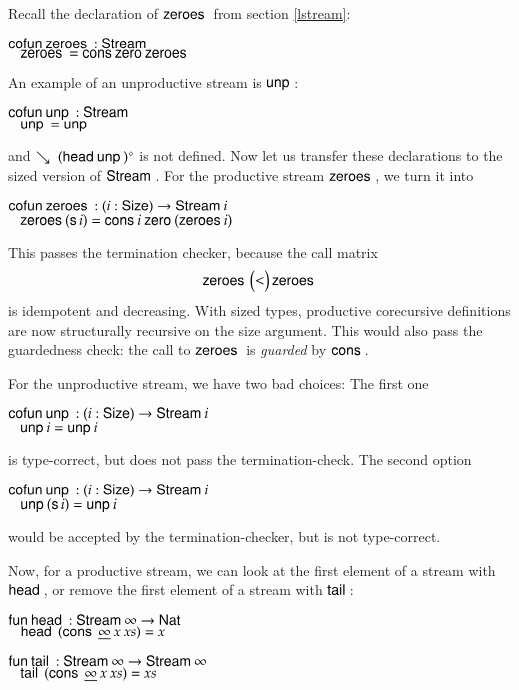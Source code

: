 Recall the declaration of $\mathsf{zeroes}\:$ from section \ref{lstream}: 
\begin{bsp}
$\mathsf{cofun}\: \mathsf{zeroes}\:: \mathsf{Stream}\: $ \\
$\hspace*{3mm} \mathsf{zeroes}\: = \mathsf{cons}\: \mathsf{zero}\: \mathsf{zeroes}\:$
\end{bsp}
\noindent An example of an unproductive stream is $\mathsf{unp}\:$:
\begin{bsp}
$\mathsf{cofun}\: \mathsf{unp}\: : \mathsf{Stream}\: $ \\
$\hspace*{3mm} \mathsf{unp}\: = \mathsf{unp}\:$
\end{bsp}
and $\searrow\; {(\mathsf{head}\: \mathsf{unp}\:)^{\diamond}}$ is not defined.
Now let us transfer these declarations to the sized version of $\mathsf{Stream}\:$.
For the productive stream $\mathsf{zeroes}\:$, we turn it into
\begin{bsp}
$\mathsf{cofun}\: \mathsf{zeroes}\:: ( i : \mathsf{Size} ) \rightarrow{\mathsf{Stream}\:i} $ \\
$\hspace*{3mm} \mathsf{zeroes}\: (\mathsf{s}\, i) = \mathsf{cons}\: i \: \mathsf{zero}\: (\mathsf{zeroes}\: i)$
\end{bsp}
This passes the termination checker, because 
the call matrix
\[
\mathsf{zeroes}\:
\begin{pmatrix}
<    
\end{pmatrix}\mathsf{zeroes}\:
\] 
is idempotent and decreasing. With sized types, productive corecursive definitions are now structurally recursive on the size argument. This would also pass the guardedness check: the call to $\mathsf{zeroes}\:$ is \emph{guarded} by $\mathsf{cons}\:$.

For the unproductive stream, we have two bad choices:
The first one
\begin{bsp}
$\mathsf{cofun}\: \mathsf{unp}\: : ( i : \mathsf{Size} ) \rightarrow{\mathsf{Stream}\:i}$ \\
$\hspace*{3mm} \mathsf{unp}\: i =  \mathsf{unp}\: i$
\end{bsp}
is type-correct, but does not pass the termination-check.
The second option
\begin{bsp}
$\mathsf{cofun}\: \mathsf{unp}\: : ( i : \mathsf{Size} ) \rightarrow{\mathsf{Stream}\:i}$ \\
$\hspace*{3mm} \mathsf{unp}\: (\mathsf{s}\, i) = \mathsf{unp}\: i $
\end{bsp}
would be accepted by the termination-checker, but is not type-correct.

Now, for a productive stream, we can look at the first element of a stream with $\mathsf{head}\:$, or remove the first element of a stream with $\mathsf{tail}\:$:
\begin{bsp}
$\mathsf{fun}\: \mathsf{head}\: : \mathsf{Stream}\: \infty \rightarrow \mathsf{Nat}\:$\\
$\hspace*{3mm} \mathsf{head}\: \: (\mathsf{cons}\: \: \underline{\infty} \: x \: xs) = x$

$\mathsf{fun}\: \mathsf{tail}\: :  \mathsf{Stream}\: \infty \rightarrow \mathsf{Stream}\: \infty $\\
$\hspace*{3mm} \mathsf{tail}\: \: (\mathsf{cons}\: \: \underline{\infty} \: x \: xs) = xs$\\
\end{bsp}

